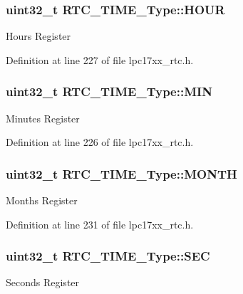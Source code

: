 \hypertarget{struct_r_t_c___t_i_m_e___type_a259724d193eb9f05640e42d4b97f4aa8}{
\subsubsection[{\-H\-O\-U\-R}]{\setlength{\rightskip}{0pt plus 5cm}uint32\-\_\-t {\bf \-R\-T\-C\-\_\-\-T\-I\-M\-E\-\_\-\-Type\-::\-H\-O\-U\-R}}}\label{struct_r_t_c___t_i_m_e___type_a259724d193eb9f05640e42d4b97f4aa8}
\-Hours \-Register 

\-Definition at line 227 of file lpc17xx\-\_\-rtc.\-h.

\hypertarget{struct_r_t_c___t_i_m_e___type_a0f2f73b9283a7f803225dc942ede894e}{
\subsubsection[{\-M\-I\-N}]{\setlength{\rightskip}{0pt plus 5cm}uint32\-\_\-t {\bf \-R\-T\-C\-\_\-\-T\-I\-M\-E\-\_\-\-Type\-::\-M\-I\-N}}}\label{struct_r_t_c___t_i_m_e___type_a0f2f73b9283a7f803225dc942ede894e}
\-Minutes \-Register 

\-Definition at line 226 of file lpc17xx\-\_\-rtc.\-h.

\hypertarget{struct_r_t_c___t_i_m_e___type_a3dea6bb0300bf97de53dbca3a74b50d8}{
\subsubsection[{\-M\-O\-N\-T\-H}]{\setlength{\rightskip}{0pt plus 5cm}uint32\-\_\-t {\bf \-R\-T\-C\-\_\-\-T\-I\-M\-E\-\_\-\-Type\-::\-M\-O\-N\-T\-H}}}\label{struct_r_t_c___t_i_m_e___type_a3dea6bb0300bf97de53dbca3a74b50d8}
\-Months \-Register 

\-Definition at line 231 of file lpc17xx\-\_\-rtc.\-h.

\hypertarget{struct_r_t_c___t_i_m_e___type_a4dcba39a8ca89d45793946d57c40caea}{
\subsubsection[{\-S\-E\-C}]{\setlength{\rightskip}{0pt plus 5cm}uint32\-\_\-t {\bf \-R\-T\-C\-\_\-\-T\-I\-M\-E\-\_\-\-Type\-::\-S\-E\-C}}}\label{struct_r_t_c___t_i_m_e___type_a4dcba39a8ca89d45793946d57c40caea}
\-Seconds \-Register 


